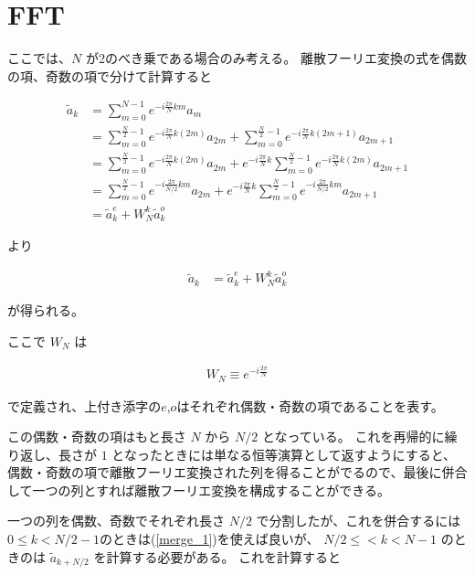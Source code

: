 \section{FFT}

ここでは、$N$ が2のべき乗である場合のみ考える。
離散フーリエ変換の式を偶数の項、奇数の項で分けて計算すると

\begin{align*}
    \tilde{a}_k &= \sum_{m = 0}^{N - 1} e^{-i\frac{2\pi}{N} km} a_m \\
                &= \sum_{m = 0}^{\frac{N}{2} - 1} e^{-i\frac{2\pi}{N} k(2m)} a_{2m} 
                   + \sum_{m = 0}^{\frac{N}{2} - 1} e^{-i\frac{2\pi}{N} k(2m + 1)} a_{2m + 1} \\ 
                &= \sum_{m = 0}^{\frac{N}{2} - 1} e^{-i\frac{2\pi}{N} k(2m)} a_{2m} 
                   + e^{-i\frac{2\pi}{N}k} \sum_{m = 0}^{\frac{N}{2} - 1} e^{-i\frac{2\pi}{N} k(2m)} a_{2m + 1} \\ 
                &= \sum_{m = 0}^{\frac{N}{2} - 1} e^{-i\frac{2\pi}{N/2} km} a_{2m} 
                   + e^{-i\frac{2\pi}{N}k} \sum_{m = 0}^{\frac{N}{2} - 1} e^{-i\frac{2\pi}{N/2} km} a_{2m + 1} \\ 
                &= \tilde{a}_k^{e} + W_N^{k} \tilde{a}_k^{o}
\end{align*}

より

\begin{align}\label{merge_1}
    \tilde{a}_k &= \tilde{a}_k^{e} + W_N^{k} \tilde{a}_k^{o}
\end{align}

が得られる。

ここで $W_N$ は

\begin{align*}
    W_N \equiv e^{-i\frac{2\pi}{N}} 
\end{align*}

で定義され、上付き添字の$e$,$o$はそれぞれ偶数・奇数の項であることを表す。

この偶数・奇数の項はもと長さ $N$ から $N/2$ となっている。
これを再帰的に繰り返し、長さが $1$ となったときには単なる恒等演算として返すようにすると、
偶数・奇数の項で離散フーリエ変換された列を得ることがでるので、最後に併合して一つの列とすれば離散フーリエ変換を構成することができる。

一つの列を偶数、奇数でそれぞれ長さ $N/2$ で分割したが、これを併合するには $0 \le k <  N/2 - 1$のときは(\ref{merge_1})を使えば良いが、 $N/2 \le < k < N - 1$ のときのは $\tilde{a}_{k + N/2}$ を計算する必要がある。 
これを計算すると


